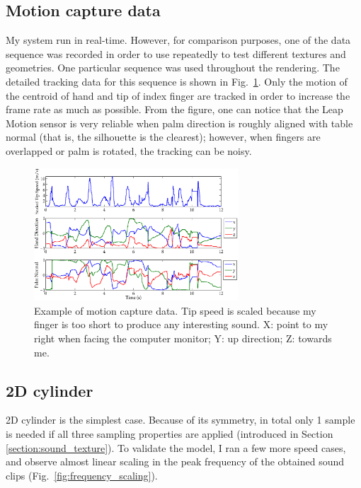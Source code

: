 \documentclass[tog]{acmsiggraph}
\begin{document}
\subsection{Motion capture data} 
My system run in real-time. However, for comparison purposes, one of the data sequence was recorded in order to use repeatedly to test different textures and geometries. One particular sequence was used throughout the rendering. The detailed tracking data for this sequence is shown in Fig.~\ref{fig:mocap}. Only the motion of the centroid of hand and tip of index finger are tracked in order to increase the frame rate as much as possible. From the figure, one can notice that the Leap Motion sensor is very reliable when palm direction is roughly aligned with table normal (that is, the silhouette is the clearest); however, when fingers are overlapped or palm is rotated, the tracking can be noisy.  

\begin{figure}[ht]
  \centering
  \includegraphics[width=3.0in]{images/mocap.eps}
  \caption{Example of motion capture data. Tip speed is scaled because my finger is too short to produce any interesting sound. X: point to my right when facing the computer monitor; Y: up direction; Z: towards me.}
  \label{fig:mocap}
\end{figure}

\subsection{2D cylinder} 
2D cylinder is the simplest case. Because of its symmetry, in total only 1 sample is needed if all three sampling properties are applied (introduced in Section \ref{section:sound_texture}). To validate the model, I ran a few more speed cases, and observe almost linear scaling in the peak frequency of the obtained sound clips (Fig.~\ref{fig:frequency_scaling}).
\end{document}
